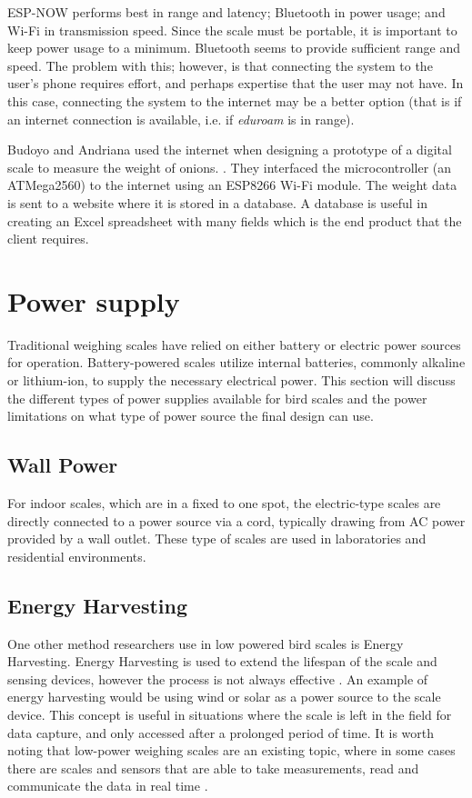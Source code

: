 \documentclass[class=report,11pt,crop=false]{standalone}
\begin{document}
ESP-NOW performs best in range and latency; Bluetooth in power usage; and Wi-Fi in transmission speed. Since the scale must be portable, it is important to keep power usage to a minimum. Bluetooth seems to provide sufficient range and speed.
The problem with this; however, is that connecting the system to the user's phone requires effort, and perhaps expertise that the user may not have. In this case, connecting the system to the internet may be a better option (that is if an internet connection is available, i.e. if \textit{eduroam} is in range). 

Budoyo and Andriana used the internet when designing a prototype of a digital scale to measure the weight of onions. \cite{iot}. They interfaced the microcontroller (an  ATMega2560) to the internet using an ESP8266 Wi-Fi module. The weight data is sent to a website where it is stored in a database. A database is useful in creating an Excel spreadsheet with many fields which is the end product that the client requires.

\section{Power supply}	
Traditional weighing scales have relied on either battery or electric power sources for operation. Battery-powered scales utilize internal batteries, commonly alkaline or lithium-ion, to supply the necessary electrical power. This section will discuss the different types of power supplies available for bird scales and the power limitations on what type of power source the final design can use.

\subsection{Wall Power}
For indoor scales, which are in a fixed to one spot, the electric-type scales are directly connected to a power source via a cord, typically drawing from AC power provided by a wall outlet. These type of scales are used in laboratories and residential environments. 

\subsection{Energy Harvesting}
One other method researchers use in low powered bird scales is Energy Harvesting. Energy Harvesting is used to extend the lifespan of the scale and sensing devices, however the process is not always effective \cite{EnergyHarvesting}. An example of energy harvesting would be using wind or solar as a power source to the scale device. This concept is useful in situations where the scale is left in the field for data capture, and only accessed after a prolonged period of time. It is worth noting that low-power weighing scales are an existing topic, where in some cases there are scales and sensors that are able to take measurements, read and communicate the data in real time \cite{ImageBased}. 
\end{document}
